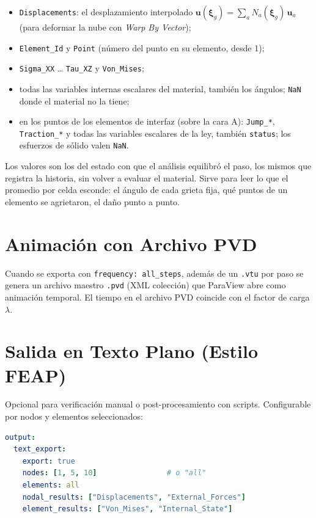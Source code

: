 \documentclass[11pt,oneside]{report}
\begin{document}
\begin{itemize}
  \item \texttt{Displacements}: el desplazamiento interpolado $\mathbf u(\boldsymbol\xi_g) = \sum_a N_a(\boldsymbol\xi_g)\,\mathbf u_a$ (para deformar la nube con \textit{Warp By Vector});
  \item \texttt{Element\_Id} y \texttt{Point} (número del punto en su elemento, desde 1);
  \item \texttt{Sigma\_XX} \ldots{} \texttt{Tau\_XZ} y \texttt{Von\_Mises};
  \item todas las variables internas escalares del material, también los ángulos; \texttt{NaN} donde el material no la tiene;
  \item en los puntos de los elementos de interfaz (sobre la cara A): \texttt{Jump\_*}, \texttt{Traction\_*} y todas las variables escalares de la ley, también \texttt{status}; los esfuerzos de sólido valen \texttt{NaN}.
\end{itemize}

Los valores son los del estado con que el análisis equilibró el paso, los mismos que registra la historia, sin volver a evaluar el material. Sirve para leer lo que el promedio por celda esconde: el ángulo de cada grieta fija, qué puntos de un elemento se agrietaron, el daño punto a punto.

\section{Animación con Archivo PVD}

Cuando se exporta con \texttt{frequency: \textquotedbl{}all\_\allowbreak{}steps\textquotedbl{}}, además de un \texttt{.vtu} por paso se genera un archivo maestro \texttt{.pvd} (XML colección) que ParaView abre como animación temporal. El \textquotedbl{}tiempo\textquotedbl{} en el archivo PVD coincide con el factor de carga $\lambda$.

\section{Salida en Texto Plano (Estilo FEAP)}

Opcional para verificación manual o post-procesamiento con scripts. Configurable por nodos y elementos seleccionados:

\begin{lstlisting}[language=yaml]
output:
  text_export:
    export: true
    nodes: [1, 5, 10]                # o "all"
    elements: all
    nodal_results: ["Displacements", "External_Forces"]
    element_results: ["Von_Mises", "Internal_State"]

\end{lstlisting}
\end{document}
